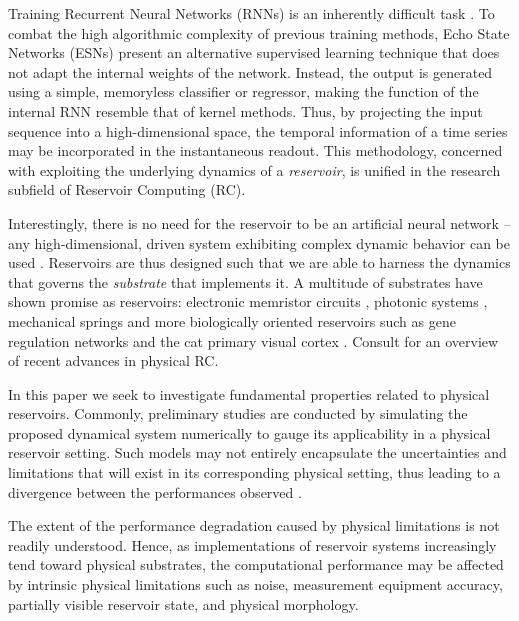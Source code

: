 Training Recurrent Neural Networks (RNNs) is an inherently difficult task
\cite{bengio_learning_1994}. To combat the high algorithmic complexity of
previous training methods, Echo State Networks (ESNs) \cite{jaeger_echo_2001}
present an alternative supervised learning technique that does not adapt the
internal weights of the network. Instead, the output is generated using a
simple, memoryless classifier or regressor, making the function of the internal
RNN resemble that of kernel methods. Thus, by projecting the input sequence into
a high-dimensional space, the temporal information of a time series may be
incorporated in the instantaneous readout. This methodology, concerned with
exploiting the underlying dynamics of a \textit{reservoir}, is unified in the
research subfield of Reservoir Computing (RC).

Interestingly, there is no need for the reservoir to be an artificial neural
network -- any high-dimensional, driven system exhibiting complex dynamic
behavior can be used \cite{schrauwen_overview_2007}. Reservoirs are thus
designed such that we are able to harness the dynamics that governs the
\textit{substrate} that implements it. A multitude of substrates have shown
promise as reservoirs: electronic memristor circuits
\cite{kulkarni_memristor-based_2012}, photonic systems
\cite{vandoorne_experimental_2014}, mechanical springs
\cite{hauser_towards_2011} and more biologically oriented reservoirs such as
gene regulation networks \cite{jones_is_2007} and the cat primary visual cortex
\cite{scholkopf_temporal_2007}. Consult \cite{tanaka_recent_2018} for an
overview of recent advances in physical RC.

In this paper we seek to investigate fundamental properties related to physical
reservoirs. Commonly, preliminary studies are conducted by simulating the
proposed dynamical system numerically to gauge its applicability in a physical
reservoir setting. Such models may not entirely encapsulate the uncertainties
and limitations that will exist in its corresponding physical setting, thus
leading to a divergence between the performances observed
\cite{vandoorne_experimental_2014, katumba_neuromorphic_2018,
  jensen_reservoir_2017}.

The extent of the performance degradation caused by physical limitations is not
readily understood. Hence, as implementations of reservoir systems increasingly
tend toward physical substrates, the computational performance may be affected
by intrinsic physical limitations such as noise, measurement equipment accuracy,
partially visible reservoir state, and physical morphology.


